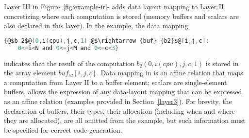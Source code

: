 

Layer III in Figure~\ref{fig:example-ir}-\codetwo{}  adds data layout mapping to Layer II, concretizing where each computation is stored (memory buffers and scalars are also declared in this layer).
In the example, the data mapping

\begin{lstlisting}[language=C,escapechar=@,numbers=none]
{@$b_2$@(0,i(cpu),j,c,1) @$\rightarrow {buf}_{b2}$@[i,j,c]:
    0<=i<N and 0<=j<M and 0<=c<3}
\end{lstlisting}

indicates that the result of the computation $b_2(0, i (cpu), j, c,1)$ is stored in the array element ${buf}_{b2}[i,j,c]$.
Data mapping in \framework is an affine relation that maps a computation from Layer II to a buffer element; scalars are single-element buffers.  \framework allows the expression of any data-layout mapping that can be expressed as an affine relation (examples provided in Section~\ref{layer3}).
For brevity, the declaration of buffers, their types, their allocation (including when and where they are allocated), are all omitted from the example, but such information must be specified for correct code generation.






